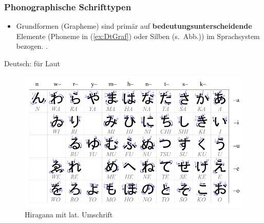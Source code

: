 \begin{frame}
\frametitle{Phonographische Schrifttypen}



\begin{itemize}
	\item Grundformen (\zB Grapheme) sind primär auf \textbf{bedeutungsunterscheidende} Elemente (\zB Phoneme in (\ref{ex:DtGraf}) oder Silben (s.\ Abb.)) im Sprachsystem bezogen. \citep[vgl.][76--77]{Duerscheid04a}.
\end{itemize}
	 
\hfill 	 
\begin{minipage}{.47\textwidth}
	\ea\label{ex:DtGraf} Deutsch:
	 für Laut \textipa{[k]}
	\z 
\end{minipage}%
\begin{minipage}{.5\textwidth}
\begin{figure}
	\centering
	
	\includegraphics[scale=.2]{material/05Table_hiragana}
	\caption{Hiragana mit lat. Umschrift}
	\label{Hiragana}
\end{figure}
\end{minipage}

\end{frame}


